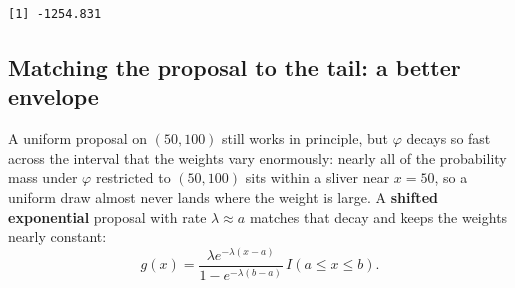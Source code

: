 \documentclass[
  letterpaper,
  DIV=11,
  numbers=noendperiod]{scrreprt}
\begin{document}
\begin{verbatim}
[1] -1254.831
\end{verbatim}

\subsection{Matching the proposal to the tail: a better
envelope}\label{matching-the-proposal-to-the-tail-a-better-envelope}

A uniform proposal on \((50,100)\) still works in principle, but
\(\varphi\) decays so fast across the interval that the weights vary
enormously: nearly all of the probability mass under \(\varphi\)
restricted to \((50,100)\) sits within a sliver near \(x=50\), so a
uniform draw almost never lands where the weight is large. A
\textbf{shifted exponential} proposal with rate \(\lambda \approx a\)
matches that decay and keeps the weights nearly constant: \[
g(x) = \frac{\lambda e^{-\lambda(x-a)}}{1-e^{-\lambda(b-a)}}\,I(a\le x\le b).
\]
\end{document}
